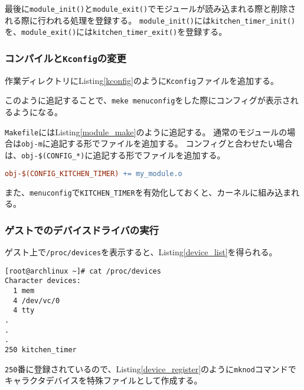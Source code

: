 \documentclass[main]{subfiles}
\begin{document}
最後に\texttt{module\_init()}と\texttt{module\_exit()}でモジュールが読み込まれる際と削除される際に行われる処理を登録する。
\texttt{module\_init()}には\texttt{kitchen\_timer\_init()}を、\texttt{module\_exit()}には\texttt{kitchen\_timer\_exit()}を登録する。

\subsubsection{コンパイルと\texttt{Kconfig}の変更}

作業ディレクトリにListing\ref{kconfig}のように\texttt{Kconfig}ファイルを追加する。



このように追記することで、\texttt{meke menuconfig}をした際にコンフィグが表示されるようになる。

\texttt{Makefile}にはListing\ref{module_make}のように追記する。
通常のモジュールの場合は\texttt{obj-m}に追記する形でファイルを追加する。
コンフィグと合わせたい場合は、\texttt{obj-\$(CONFIG\_*)}に追記する形でファイルを追加する。

\begin{lstlisting}[label=module_make,caption=モジュールの\texttt{make},language=make]
obj-$(CONFIG_KITCHEN_TIMER) += my_module.o
\end{lstlisting}

また、\texttt{menuconfig}で\texttt{KITCHEN\_TIMER}を有効化しておくと、カーネルに組み込まれる。

\subsubsection{ゲストでのデバイスドライバの実行}

ゲスト上で\texttt{/proc/devices}を表示すると、Listing\ref{device_list}を得られる。

\begin{lstlisting}[label=device_list,caption=\texttt{/proc/devices}を表示する]
[root@archlinux ~]# cat /proc/devices
Character devices:
  1 mem
  4 /dev/vc/0
  4 tty
.
.
.
250 kitchen_timer
\end{lstlisting}

\texttt{250}番に登録されているので、Listing\ref{device_register}のように\texttt{mknod}コマンドでキャラクタデバイスを特殊ファイルとして作成する。
\end{document}
